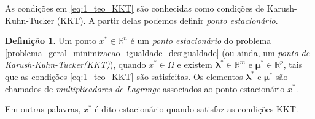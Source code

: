 \documentclass[12pt,a4paper]{scrartcl}
\def\RR{\mathds{R}}
\theoremstyle{definition}%
\newtheorem{defi}{Definição}
\begin{document}
As condições em \eqref{eq:1_teo_KKT} são conhecidas como condições de Karush-Kuhn-Tucker (KKT). A partir delas podemos definir \emph{ponto estacionário}.

\begin{defi} \label{defi:ponto_estacionario_KKT}
Um ponto $x^{*} \in \RR^{n} $ é um \emph{ponto estacionário} do problema \eqref{problema_geral_minimizacao_igualdade_desigualdade} (ou ainda, um \emph{ponto de Karush-Kuhn-Tucker(KKT)}), quando $x^{*} \in \Omega$ e existem $\boldsymbol{\lambda}^{*} \in \RR^{m}$ e $\boldsymbol{\mu}^{*} \in \RR^{p}$, tais que as condições \eqref{eq:1_teo_KKT} são satisfeitas. Os elementos $\boldsymbol{\lambda}^{*}$ e $\boldsymbol{\mu}^{*}$ são chamados de \emph{multiplicadores de Lagrange} associados ao ponto estacionário $x^{*}$.
\end{defi}
Em outras palavras, $x^{*}$ é dito estacionário quando satisfaz as condições KKT. 



\end{document}
